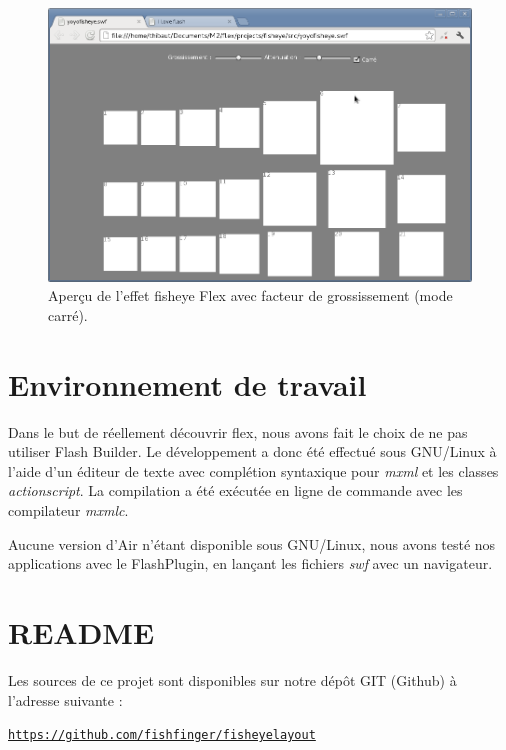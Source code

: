 \begin{minipage}[H]{.5\textwidth}
\begin{figure}[H]
  \centering
  \includegraphics[width=\textwidth]{../resources/illustrations/flex_screen_3}
  \caption{Aperçu de l'effet fisheye Flex avec facteur de grossissement (mode carré).}
  \label{fig:js_6}
\end{figure}
\end{minipage}

\section{Environnement de travail}

Dans le but de réellement découvrir flex, nous avons fait le choix de ne pas utiliser Flash Builder. Le développement a donc été effectué sous GNU/Linux à l'aide d'un éditeur de texte avec complétion syntaxique pour \emph{mxml} et les classes \emph{actionscript}. La compilation a été exécutée en ligne de commande avec les compilateur \emph{mxmlc}.

Aucune version d'Air n'étant disponible sous GNU/Linux, nous avons testé nos applications avec le FlashPlugin, en lançant les fichiers \emph{swf} avec un navigateur.

\section{README}
\label{sec:readme}
Les sources de ce projet sont disponibles sur notre dépôt GIT (Github) à l'adresse suivante :
\begin{center}
  \href{https://github.com/fishfinger/fisheyelayout}{\texttt{https://github.com/fishfinger/fisheyelayout}}
\end{center}

